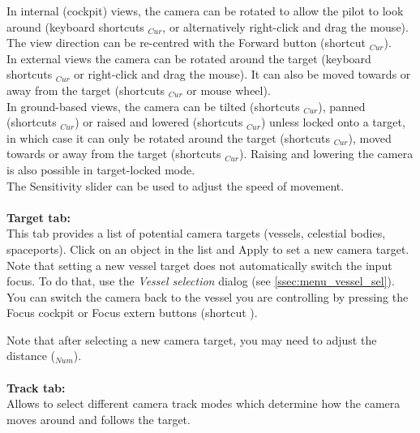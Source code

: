 \documentclass[Orbiter User Manual.tex]{subfiles}
\begin{document}
\noindent
In internal (cockpit) views, the camera can be rotated to allow the pilot to look around (keyboard shortcuts \Alt\DArrow\UArrow\RArrow\LArrow$_{Cur}$, or alternatively right-click and drag the mouse). The view direction can be re-centred with the Forward button (shortcut \Home$_{Cur}$).\\
In external views the camera can be rotated around the target (keyboard shortcuts \Ctrl\DArrow\UArrow\RArrow\LArrow$_{Cur}$ or right-click and drag the mouse). It can also be moved towards or away from the target (shortcuts $_{Cur}$ or mouse wheel).\\
In ground-based views, the camera can be tilted (shortcuts \DArrow\UArrow\RArrow\LArrow$_{Cur}$), panned (shortcuts \Ctrl\DArrow\UArrow\RArrow\LArrow$_{Cur}$) or raised and lowered (shortcuts $_{Cur}$) unless locked onto a target, in which case it can only be rotated around the target (shortcuts \Ctrl\RArrow\LArrow$_{Cur}$), moved towards or away from the target (shortcuts \Ctrl\DArrow\UArrow$_{Cur}$). Raising and lowering the camera is also possible in target-locked mode.\\
The Sensitivity slider can be used to adjust the speed of movement.\\
\\
\textbf{Target tab:}\\
This tab provides a list of potential camera targets (vessels, celestial bodies, spaceports). Click on an object in the list and Apply to set a new camera target. Note that setting a new vessel target does not automatically switch the input focus. To do that, use the \textit{Vessel selection} dialog (see \ref{ssec:menu_vessel_sel}). You can switch the camera back to the vessel you are controlling by pressing the Focus cockpit or Focus extern buttons (shortcut ).\\

\begin{figure}[H]
	\centering
\end{figure}

\noindent
Note that after selecting a new camera target, you may need to adjust the distance ($_{Num}$).\\
\\
\textbf{Track tab:}\\
Allows to select different camera track modes which determine how the camera moves around and follows the target.\\
\end{document}
